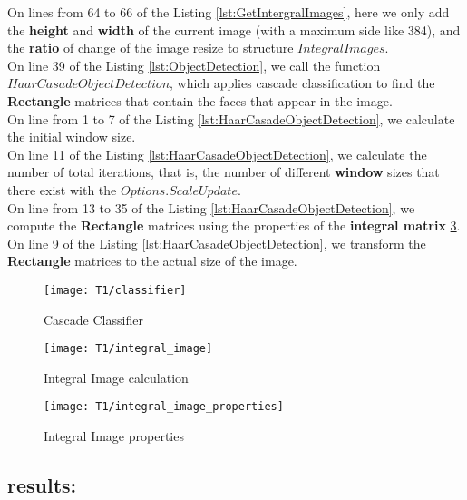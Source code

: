 \noindent On lines from 64 to 66 of the Listing \ref{lst:GetIntergralImages}, here we only add the \textbf{height} and \textbf{width} of the current image (with a maximum side like 384), and the \textbf{ratio} of change of the image resize to structure $IntegralImages$.\\ %

\noindent On line 39 of the Listing \ref{lst:ObjectDetection}, we call the function $HaarCasadeObjectDetection$, which applies cascade classification to find the \textbf{Rectangle} matrices that contain the faces that appear in the image.\\

\noindent On line from 1 to 7 of the Listing \ref{lst:HaarCasadeObjectDetection}, we calculate the initial window size.\\

\noindent On line 11  of the Listing \ref{lst:HaarCasadeObjectDetection}, we calculate the number of total iterations, that is, the number of different \textbf{window} sizes that there exist with the $Options.ScaleUpdate$.\\

\noindent On line from 13 to 35 of the Listing \ref{lst:HaarCasadeObjectDetection}, we compute the \textbf{Rectangle} matrices using the properties of the \textbf{integral matrix} \ref{fig:integral_properties}.\\

\noindent On line 9  of the Listing \ref{lst:HaarCasadeObjectDetection}, we transform the \textbf{Rectangle} matrices to the actual size of the image.



\begin{figure}[h]
	\centering
	\texttt{[image: T1/classifier]}
	\caption{Cascade Classifier}
	\label{fig:slideT1}
\end{figure}
\begin{figure}[h]
	\centering
	\texttt{[image: T1/integral\_image]}
	\caption{Integral Image calculation}
	\label{fig:integral}
\end{figure}
\begin{figure}[h]
	\centering
	\texttt{[image: T1/integral\_image\_properties]}
	\caption{Integral Image properties}
	\label{fig:integral_properties}
\end{figure}

\subsection{results:}

